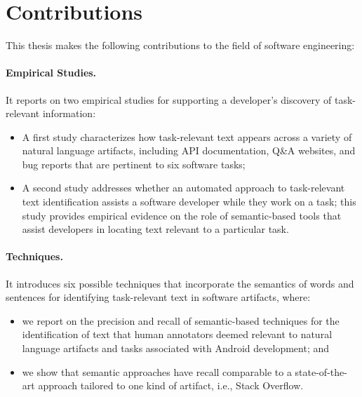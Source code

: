 

\section{Contributions}
\label{cp1:contributions}

This thesis makes the following contributions to the field of software engineering:








\paragraph{\textbf{Empirical Studies.}} 

It reports on two empirical studies for supporting a developer's discovery of task-relevant information:

\begin{itemize}

    \item A first study characterizes how task-relevant text appears across a variety of natural language artifacts, including  API documentation, Q\&A websites, and
    bug reports that are pertinent to six software tasks; 

    \item A second study addresses whether 
    an automated approach to task-relevant text identification assists a software developer while they work on a task; this study provides empirical evidence on the role of semantic-based tools that assist developers in locating 
    text relevant to a particular task.
\end{itemize}




\paragraph{\textbf{Techniques.}} 

It introduces six possible techniques that incorporate the semantics of words and sentences for identifying task-relevant text in software artifacts, where:
    
\begin{itemize}
    
    \item we report on the precision and recall of semantic-based techniques for the identification of text that human annotators deemed relevant to natural language artifacts and tasks associated with Android development; and

    \item we show that semantic approaches have recall comparable to a state-of-the-art approach
    tailored to one kind of artifact, i.e., Stack Overflow.
\end{itemize}

